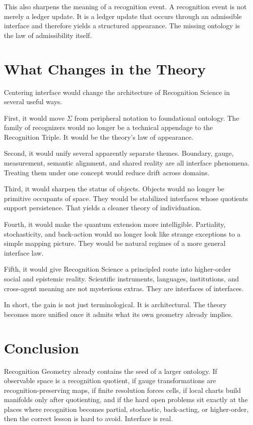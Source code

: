 \documentclass[11pt]{article}
\begin{document}
This also sharpens the meaning of a recognition event.
A recognition event is not merely a ledger update.
It is a ledger update that occurs through an admissible interface and therefore yields a structured appearance.
The missing ontology is the law of admissibility itself.

\section{What Changes in the Theory}

Centering interface would change the architecture of Recognition Science in several useful ways.

First, it would move $\Sigma$ from peripheral notation to foundational ontology.
The family of recognizers would no longer be a technical appendage to the Recognition Triple.
It would be the theory's law of appearance.

Second, it would unify several apparently separate themes.
Boundary, gauge, measurement, semantic alignment, and shared reality are all interface phenomena.
Treating them under one concept would reduce drift across domains.

Third, it would sharpen the status of objects.
Objects would no longer be primitive occupants of space.
They would be stabilized interfaces whose quotients support persistence.
That yields a cleaner theory of individuation.

Fourth, it would make the quantum extension more intelligible.
Partiality, stochasticity, and back-action would no longer look like strange exceptions to a simple mapping picture.
They would be natural regimes of a more general interface law.

Fifth, it would give Recognition Science a principled route into higher-order social and epistemic reality.
Scientific instruments, languages, institutions, and cross-agent meaning are not mysterious extras.
They are interfaces of interfaces.

In short, the gain is not just terminological.
It is architectural.
The theory becomes more unified once it admits what its own geometry already implies.

\section{Conclusion}

Recognition Geometry already contains the seed of a larger ontology.
If observable space is a recognition quotient, if gauge transformations are recognition-preserving maps, if finite resolution forces cells, if local charts build manifolds only after quotienting, and if the hard open problems sit exactly at the places where recognition becomes partial, stochastic, back-acting, or higher-order, then the correct lesson is hard to avoid.
Interface is real.
\end{document}
